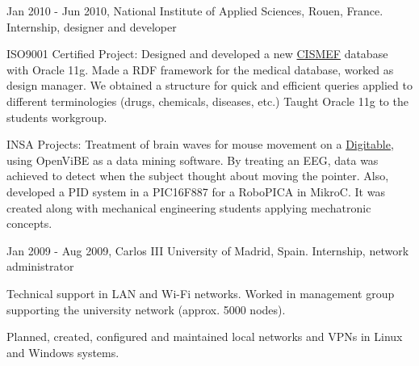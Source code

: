 \experience
  {Jan 2010 - Jun 2010, National Institute of Applied Sciences, Rouen, France.}
  {Internship, designer and developer}
  {\vspace{-1em}\begin{rlist}
    \item ISO9001 Certified Project: Designed and developed a new \href{http://www.cismef.org}{CISMEF}
    database with Oracle 11g. Made a RDF
    framework for the medical database, worked as design manager. We obtained a
    structure for quick and efficient queries applied to different
    terminologies (drugs, chemicals, diseases, etc.)
    Taught Oracle 11g to the students workgroup.
    \item INSA Projects: Treatment of brain waves for mouse movement on a \href{http://digitable.imag.fr/}{Digitable}, using OpenViBE as a data mining software. By treating an EEG, data was achieved to detect when the subject thought about moving the pointer. Also, developed a PID system in a PIC16F887 for a RoboPICA in MikroC. It was created along with mechanical engineering students applying mechatronic concepts. 
  \end{rlist}}

\experience
  {Jan 2009 - Aug 2009, Carlos III University of Madrid, Spain.}
  {Internship, network administrator}
  {\vspace{-1em}\begin{rlist}
    \item Technical support in LAN and Wi-Fi networks. Worked in management
    group supporting the university network (approx. 5000 nodes).
    \item Planned, created, configured and maintained local networks and
    VPNs in Linux and Windows systems.
  \end{rlist}}
